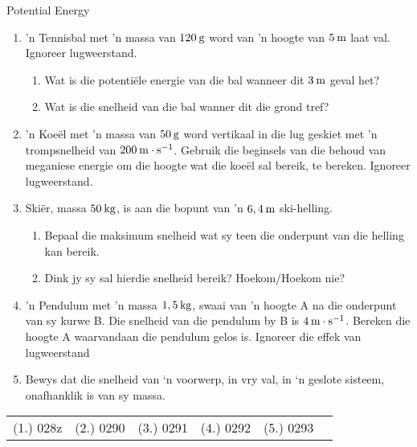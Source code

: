\begin{exercises}{Potential Energy}
\begin{enumerate}[noitemsep, label=\textbf{\arabic*}. ] 
    \item 'n Tennisbal met 'n massa van $120\phantom{\rule{2pt}{0ex}}\text{g}$ word van 'n hoogte van $5\phantom{\rule{2pt}{0ex}}\text{m}$ laat val. Ignoreer lugweerstand.
    \begin{enumerate}[noitemsep, label=\textbf{\alph*}. ] 
    \item Wat is die potenti\"ele energie van die bal wanneer dit $3\phantom{\rule{2pt}{0ex}}\text{m}$ geval het?
    \item Wat is die snelheid van die bal wanner dit die grond tref?
    \end{enumerate}
    \item 'n Koe\"el met 'n massa van $50\phantom{\rule{2pt}{0ex}}\text{g}$ word vertikaal in die lug geskiet met 'n trompsnelheid van $200\phantom{\rule{2pt}{0ex}}\text{m}\ensuremath{\cdot}\text{s}{}^{-1}$. Gebruik die beginsels van die behoud van meganiese energie om die hoogte wat die koe\"el sal bereik, te bereken. Ignoreer lugweerstand.
    \item \n Ski\"er, massa $50\phantom{\rule{2pt}{0ex}}\text{kg}$, is aan die bopunt van 'n $6,4\phantom{\rule{2pt}{0ex}}\text{m}$ ski-helling.
    \begin{enumerate}[noitemsep, label=\textbf{\alph*}. ] 
    \item Bepaal die maksimum snelheid wat sy teen die onderpunt van die helling kan bereik.
    \item Dink jy sy sal hierdie snelheid bereik? Hoekom/Hoekom nie?
    \end{enumerate}
    \item 'n Pendulum met 'n massa $1,5\phantom{\rule{2pt}{0ex}}\text{kg}$, swaai van 'n hoogte A na die onderpunt van sy kurwe B. Die snelheid van die pendulum by B is $4\phantom{\rule{2pt}{0ex}}\text{m}\ensuremath{\cdot}\text{s}{}^{-1}$. Bereken die hoogte A waarvandaan die pendulum gelos is. Ignoreer die effek van lugweerstand \newline
    \item Bewys dat die snelheid van ‘n voorwerp, in vry val, in ‘n geslote sisteem, onafhanklik is van sy massa.\newline
\end{enumerate}

\practiceinfo
\par \begin{tabular}[h]{cccccc}
(1.) 028z  &  (2.) 0290  &  (3.) 0291  &  (4.) 0292  &  (5.) 0293  & \end{tabular}
\end{exercises}
